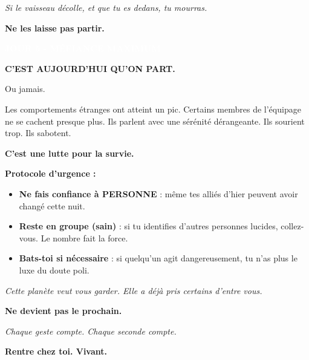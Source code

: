 \documentclass[a4paper,10pt]{article}
\newcommand{\fichenonparasite}[1]{
\colorbox{safecolor}{\textcolor{white}{\textbf{#1}}}
}
\begin{document}
\begin{minipage}[t]{0.48\textwidth}
\vspace{0.2cm}

\textit{Si le vaisseau décolle, et que tu es dedans, tu mourras.}

\vspace{0.2cm}

{\Large \textbf{Ne les laisse pas partir.}}
\end{minipage}
\hfill
\begin{minipage}[t]{0.48\textwidth}
\raggedright
\fichenonparasite{JOUR 5 - MÉFIANCE MAXIMUM}

\vspace{0.2cm}

{\Large \textbf{C'EST AUJOURD'HUI QU'ON PART.}}

\vspace{0.2cm}

Ou jamais.

\vspace{0.2cm}

Les comportements étranges ont atteint un pic. Certains membres de l'équipage ne se cachent presque plus. Ils parlent avec une sérénité dérangeante. Ils sourient trop. Ils sabotent.

\vspace{0.2cm}

\textbf{C'est une lutte pour la survie.}

\vspace{0.2cm}

\textbf{Protocole d'urgence :}

\begin{itemize}
\setlength\itemsep{0.1em}
\item \textbf{Ne fais confiance à PERSONNE} : même tes alliés d'hier peuvent avoir changé cette nuit.
\item \textbf{Reste en groupe (sain)} : si tu identifies d'autres personnes lucides, collez-vous. Le nombre fait la force.
\item \textbf{Bats-toi si nécessaire} : si quelqu'un agit dangereusement, tu n'as plus le luxe du doute poli.
\end{itemize}

\vspace{0.2cm}

\textit{Cette planète veut vous garder. Elle a déjà pris certains d'entre vous.}

\vspace{0.2cm}

\textbf{Ne devient pas le prochain.}

\vspace{0.2cm}

\textit{Chaque geste compte. Chaque seconde compte.}

\vspace{0.2cm}

{\Large \textbf{Rentre chez toi. Vivant.}}
\end{minipage}
\end{document}
